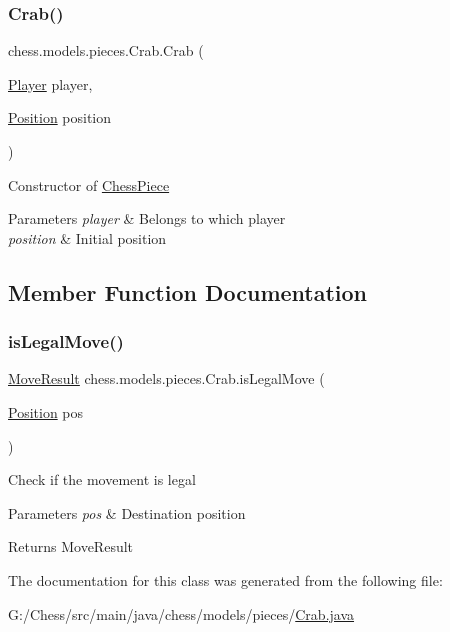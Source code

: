 \subsubsection{\texorpdfstring{Crab()}{Crab()}}
{\footnotesize\ttfamily chess.\+models.\+pieces.\+Crab.\+Crab (\begin{DoxyParamCaption}\item[{\mbox{\hyperlink{enumchess_1_1models_1_1enums_1_1_player}{Player}}}]{player,  }\item[{\mbox{\hyperlink{classchess_1_1models_1_1_position}{Position}}}]{position }\end{DoxyParamCaption})}

Constructor of \mbox{\hyperlink{classchess_1_1models_1_1_chess_piece}{Chess\+Piece}}


\begin{DoxyParams}{Parameters}
{\em player} & Belongs to which player \\
\hline
{\em position} & Initial position \\
\hline
\end{DoxyParams}


\subsection{Member Function Documentation}
\mbox{\label{classchess_1_1models_1_1pieces_1_1_crab_a391e322738ac0974c9ef4a26af1a7de2}} 
\subsubsection{\texorpdfstring{is\+Legal\+Move()}{isLegalMove()}}
{\footnotesize\ttfamily \mbox{\hyperlink{enumchess_1_1models_1_1enums_1_1_move_result}{Move\+Result}} chess.\+models.\+pieces.\+Crab.\+is\+Legal\+Move (\begin{DoxyParamCaption}\item[{\mbox{\hyperlink{classchess_1_1models_1_1_position}{Position}}}]{pos }\end{DoxyParamCaption})}

Check if the movement is legal 
\begin{DoxyParams}{Parameters}
{\em pos} & Destination position \\
\hline
\end{DoxyParams}
\begin{DoxyReturn}{Returns}
Move\+Result 
\end{DoxyReturn}


The documentation for this class was generated from the following file\+:\begin{DoxyCompactItemize}
\item 
G\+:/\+Chess/src/main/java/chess/models/pieces/\mbox{\hyperlink{_crab_8java}{Crab.\+java}}\end{DoxyCompactItemize}
